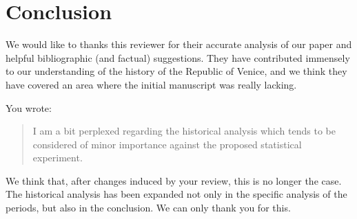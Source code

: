 \documentclass[11pt]{article}
\newcounter{reviewer}
\begin{document}
 \section*{Conclusion}

 We would like to thanks this reviewer for their accurate analysis of our paper
 and helpful bibliographic (and factual) suggestions. They have contributed
 immensely to our understanding of the history of the Republic of Venice, and we
 think they have covered an area where the initial manuscript was really
 lacking.

 You wrote:\begin{quote}
    I am a bit perplexed regarding the historical
analysis which tends to be considered of minor importance against the proposed
statistical experiment.
\end{quote}

We think that, after changes induced by your review, this is no longer the
case. The historical analysis has been expanded not only in the specific
analysis of the periods, but also in the conclusion. We can only thank you for
this.



\end{document}
